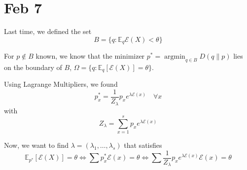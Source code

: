 \documentclass[12pt]{article}
\newcommand{\E}{\mathbb{E}}
\newcommand{\Ec}{\mathcal{E}}
\DeclareMathOperator*{\argmin}{\arg\min}
\begin{document}
\section{Feb 7}
Last time, we defined the set
\[B = \{q: \E_q \Ec(X) < \theta\}\]

For $p \notin B$ known, we know that the minimizer $p^* = \argmin_{q\in B} D(q \parallel p)$ lies on the boundary of $B$, $\Omega = \{q: \E_q [\Ec(X)] = \theta\}$.

Using Lagrange Multipliers, we found
\[p_x^* = \frac{1}{Z_{\lambda}} p_x  e^{\lambda \Ec(x)} \quad \forall x\]
with
\[Z_{\lambda} = \sum_{x=1}^{s} p_xe^{\lambda \Ec(x)}\]

Now, we want to find $\lambda = (\lambda_1, \dots, \lambda_s)$ that satisfies
\[\E_{p^*}[\Ec(X)] = \theta \iff \sum p_x^* \Ec(x) = \theta \iff \sum \frac{1}{Z_{\lambda}} p_x e^{\lambda \Ec(x)} \Ec(x) = \theta\]
\end{document}

